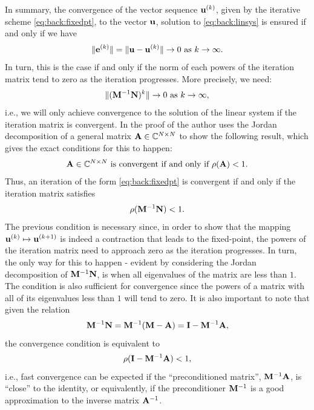 In summary, the convergence of the vector sequence $\mathbf{u}^{(k)}$, given by the iterative scheme \eqref{eq:back:fixedpt}, to the vector $\mathbf{u}$, solution to \eqref{eq:back:linsys} is ensured if and only if we have
\begin{equation*}
\|\mathbf{e}^{(k)}\|=\|\mathbf{u}-\mathbf{u}^{(k)}\|\to0\text{ as } k\to\infty.
\end{equation*}
In turn, this is the case if and only if the norm of each powers of the iteration matrix tend to zero as the iteration progresses. More precisely, we need:
\begin{equation*}
\|(\mathbf{M}^{-1}\mathbf{N})^{k}\|\to0\text{ as } k\to\infty,
\end{equation*}
i.e., we will only achieve convergence to the solution of the linear system if the iteration matrix is convergent. In the proof of \cite[Theorem 1.10]{Var09} the author uses the Jordan decomposition of a general matrix $\mathbf{A}\in\mathbb{C}^{N\times N}$ to show the following result, which gives the exact conditions for this to happen:
\begin{equation}
\mathbf{A}\in\mathbb{C}^{N\times N}\text{ is convergent if and only if } \rho(\mathbf{A})<1.
\label{eq:back:convergence}
\end{equation}
Thus, an iteration of the form \eqref{eq:back:fixedpt} is convergent if and only if the iteration matrix satisfies
\begin{equation}
\rho(\mathbf{M}^{-1}\mathbf{N})<1.
\end{equation}
The previous condition is necessary since, in order to show that the mapping $\mathbf{u}^{(k)}\mapsto\mathbf{u}^{(k+1)}$ is indeed a contraction that leads to the fixed-point, the powers of the iteration matrix need to approach zero as the iteration progresses. In turn, the only way for this to happen - evident by considering the Jordan decomposition of $\mathbf{M}^{-1}\mathbf{N}$, is when all eigenvalues of the matrix are less than $1$. The condition is also sufficient for convergence since the powers of a matrix with all of its eigenvalues less than $1$ will tend to zero. It is also important to note that given the relation
\begin{equation*}
\label{eq:back:itermat}
\mathbf{M}^{-1}\mathbf{N} = \mathbf{M}^{-1}(\mathbf{M}-\mathbf{A}) = \mathbf{I} - \mathbf{M}^{-1}\mathbf{A},
\end{equation*}
the convergence condition is equivalent to
\[
\rho( \mathbf{I} - \mathbf{M}^{-1}\mathbf{A} )< 1,
\]
i.e., fast convergence can be expected if the ``preconditioned matrix'',
$\mathbf{M}^{-1}\mathbf{A}$, is ``close'' to the identity, or equivalently, if the preconditioner $\mathbf{M}^{-1}$ is a good approximation to the inverse matrix $\mathbf{A}^{-1}$.

